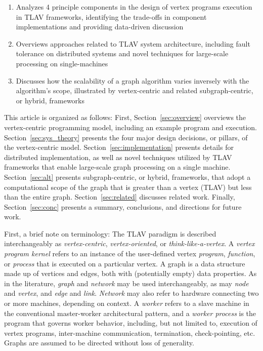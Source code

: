\documentclass[reprint,twocolumn,showpacs,preprintnumbers,amsmath, aps,pre,amssymb]{revtex4-1}
\begin{document}
\begin{enumerate}
\item Analyzes 4 principle components in the design of vertex programs execution in TLAV frameworks, identifying the trade-offs in component implementations and providing data-driven discussion
\item Overviews approaches related to TLAV system architecture, including fault tolerance on distributed systems and novel techniques for large-scale processing on single-machines
\item Discusses how the scalability of a graph algorithm varies inversely with the algorithm's scope, illustrated by vertex-centric and related subgraph-centric, or hybrid, frameworks
\end{enumerate}

This article is organized as follows: First, Section~\ref{sec:overview} overviews the vertex-centric programming model, including an example program and execution.  Section~\ref{sec:sys_theory} presents the four major design decisions, or pillars, of the vertex-centric model. Section~\ref{sec:implementation} presents details for distributed implementation, as well as novel techniques utilized by TLAV frameworks that enable large-scale graph processing on a single machine.  Section~\ref{sec:alt} presents subgraph-centric, or hybrid, frameworks, that adopt a computational scope of the graph that is greater than a vertex (TLAV) but less than the entire graph.  Section~\ref{sec:related} discusses related work.  Finally, Section~\ref{sec:conc} presents a summary, conclusions, and directions for future work.

First, a brief note on terminology:  The TLAV paradigm is described interchangeably as \textit{vertex-centric}, \textit{vertex-oriented}, or \textit{think-like-a-vertex}.  A \textit{vertex program kernel} refers to an instance of the user-defined vertex \textit{program}, \textit{function}, or \textit{process} that is executed on a particular vertex.  A graph is a data structure made up of vertices and edges, both with (potentially empty) data properties.  As in the literature, \textit{graph} and \textit{network} may be used interchangeably, as may \textit{node} and \textit{vertex}, and \textit{edge} and \textit{link}.  \textit{Network} may also refer to hardware connecting two or more machines, depending on context.  A \textit{worker} refers to a slave machine in the conventional master-worker architectural pattern, and a \textit{worker process} is the program that governs worker behavior, including, but not limited to, execution of vertex programs, inter-machine communication, termination, check-pointing, etc.  Graphs are assumed to be directed without loss of generality.
\end{document}
